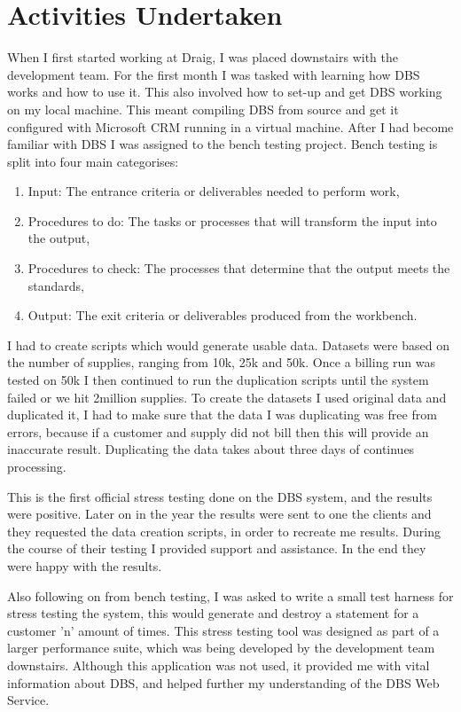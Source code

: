\documentclass[paper=a4, fontsize=11pt]{scrartcl}	%
\begin{document}
\section{Activities Undertaken}
When I first started working at Draig, I was placed downstairs with the development team.  For the first month I was tasked with learning how DBS works and how to use it.  This also involved how to set-up and get DBS working on my local machine. This meant compiling DBS from source and get it configured with Microsoft CRM running in a virtual machine. After I had become familiar with DBS I was assigned to the bench testing project. Bench testing is split into four main categorises: 

\begin{enumerate}
	\item Input: The entrance criteria or deliverables needed to perform work, 
	\item Procedures to do: The tasks or processes that will transform the input into the output, 
	\item Procedures to check: The processes that determine that the output meets the standards, 
	\item Output: The exit criteria or deliverables produced from the workbench. 
\end{enumerate}


I had to create scripts which would generate usable data. Datasets were based on the number of supplies, ranging from 10k, 25k and 50k. Once a billing run was tested on 50k I then continued to run the duplication scripts until the system failed or we hit 2million supplies. To create the datasets I used original data and duplicated it, I had to make sure that the data I was duplicating was free from errors, because if a customer and supply did not bill then this will provide an inaccurate result. Duplicating the data takes about three days of continues processing.

This is the first official stress testing done on the DBS system, and the results were positive. Later on in the year the results were sent to one the clients and they requested the data creation scripts, in order to recreate me results. During the course of their testing I provided support and assistance. In the end they were happy with the results.

Also following on from bench testing, I was asked to write a small test harness for stress testing the system, this would generate and destroy a statement for a customer 'n' amount of times. This stress testing tool was designed as part of a larger performance suite, which was being developed by the development team downstairs.  Although this application was not used, it provided me with vital information about DBS, and helped further my understanding of the DBS Web Service.
\end{document}
